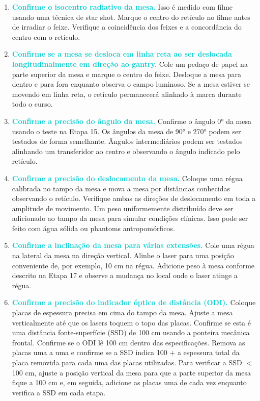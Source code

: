 \documentclass[11pt,a4paper]{article}
\newcounter{exemplo}
\begin{document}
\begin{enumerate}[label=\textcolor{CarnationPink}{\arabic*${}^\circ $}]
		\item \textcolor{DarkTurquoise}{\textbf{Confirme o isocentro radiativo da mesa.}} Isso é medido com filme usando uma técnica de star shot. Marque o centro do retículo no filme antes de irradiar o feixe. Verifique a coincidência dos feixes e a concordância do centro com o retículo.
		
		\item \textcolor{DarkTurquoise}{\textbf{Confirme se a mesa se desloca em linha reta ao ser deslocada longitudinalmente em direção ao gantry.}} Cole um pedaço de papel na parte superior da mesa e marque o centro do feixe. Desloque a mesa para dentro e para fora enquanto observa o campo luminoso. Se a mesa estiver se movendo em linha reta, o retículo permanecerá alinhado à marca durante todo o curso.
		
		\item \textcolor{DarkTurquoise}{\textbf{Confirme a precisão do ângulo da mesa.}} Confirme o ângulo \ang{0} da mesa usando o teste na Etapa 15. Os ângulos da mesa de \ang{90} e \ang{270} podem ser testados de forma semelhante. Ângulos intermediários podem ser testados alinhando um transferidor ao centro e observando o ângulo indicado pelo retículo.
		
		\item \textcolor{DarkTurquoise}{\textbf{Confirme a precisão do deslocamento da mesa.}} Coloque uma régua calibrada no tampo da mesa e mova a mesa por distâncias conhecidas observando o retículo. Verifique ambas as direções de deslocamento em toda a amplitude de movimento. Um peso uniformemente distribuído deve ser adicionado ao tampo da mesa para simular condições clínicas. Isso pode ser feito com água sólida ou phantoms antropomórficos.
		
		\item \textcolor{DarkTurquoise}{\textbf{Confirme a inclinação da mesa para várias extensões.}} Cole uma régua na lateral da mesa na direção vertical. Alinhe o laser para uma posição conveniente de, por exemplo, 10 cm na régua. Adicione peso à mesa conforme descrito na Etapa 17 e observe a mudança no local onde o laser atinge a régua.
		
		\item \textcolor{DarkTurquoise}{\textbf{Confirme a precisão do indicador óptico de distância (ODI).}} Coloque placas de espessura precisa em cima do tampo da mesa. Ajuste a mesa verticalmente até que os lasers toquem o topo das placas. Confirme se esta é uma distância fonte-superfície (SSD) de 100 cm usando a ponteira mecânica frontal. Confirme se o ODI lê 100 cm dentro das especificações. Remova as placas uma a uma e confirme se a SSD indica 100 $+$ a espessura total da placa removida para cada uma das placas utilizadas. Para verificar a SSD $<$ 100 cm, ajuste a posição vertical da mesa para que a parte superior da mesa fique a 100 cm e, em seguida, adicione as placas uma de cada vez enquanto verifica a SSD em cada etapa.

	\end{enumerate}
\end{document}
